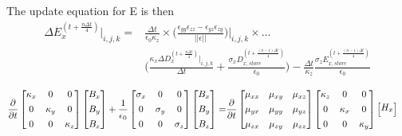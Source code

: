 \documentclass[]{article}
\begin{document}
		The update equation for E is then 
		\begin{align}
			\Delta E_{x}^{(t+\frac{n\Delta t}{4})}|_{i, j, k} = &
			\frac{\Delta t}{\epsilon_{0}\kappa_{z}}\times\bigg(\frac{\epsilon_{yy}\epsilon_{zz} - \epsilon_{yz}\epsilon_{zy}}{||\epsilon||}\bigg)\bigg|_{i, j, k}\times\dots \nonumber \\
			&\bigg(\frac{\kappa_{x}\Delta D_{x}^{(t+\frac{n\Delta t}{4})}|_{i, j, k}}{\Delta t} + \frac{\sigma_{x}D_{x, store}^{(t + \frac{(n-1)\Delta t}{4})}}{\epsilon_{0}}\bigg) - \frac{\Delta t}{\kappa_{z}}\frac{\sigma_{z}E_{x, store}^{(t + \frac{(n-1)\Delta t}{4})}}{\epsilon_{0}}
		\end{align}
				
		\begin{align}
			\pdv{}{t}\begin{bmatrix}
				\kappa_{x} & 0 & 0 \\[4pt]
				0 & \kappa_{y} & 0 \\[4pt] 
				0 & 0 & \kappa_{z}
			\end{bmatrix}
			\begin{bmatrix}
				B_{x} \\[4pt]
				B_{y} \\[4pt]
				B_{z} 
			\end{bmatrix} + 
			\frac{1}{\epsilon_{0}}
			\begin{bmatrix}
				\sigma_{x} & 0 & 0 \\[4pt]
				0 & \sigma_{y} & 0 \\[4pt] 
				0 & 0 & \sigma_{z}
			\end{bmatrix}
			\begin{bmatrix}
				B_{x} \\[4pt]
				B_{y} \\[4pt]
				B_{z} 
			\end{bmatrix} = &
			\pdv{}{t}
			\begin{bmatrix}
				\mu_{xx} & \mu_{xy} & \mu_{xz} \\[4pt]
				\mu_{yx} & \mu_{yy} & \mu_{yz} \\[4pt] 
				\mu_{zx} & \mu_{zy} & \mu_{zz}
			\end{bmatrix}
			\begin{bmatrix}
				\kappa_{z} & 0 & 0 \\[4pt]
				0 & \kappa_{x} & 0 \\[4pt] 
				0 & 0 & \kappa_{y}
			\end{bmatrix}
			\begin{bmatrix}
				H_{x} \\[4pt]

\end{bmatrix}
\end{align}
\end{document}
